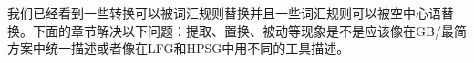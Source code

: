 
\largerpage
我们已经看到一些转换可以被词汇规则替换并且一些词汇规则可以被空中心语替换。下面的章节解决以下问题：提取、置换、被动等现象是不是应该像在GB/最简方案中统一描述或者像在LFG和HPSG中用不同的工具描述。


